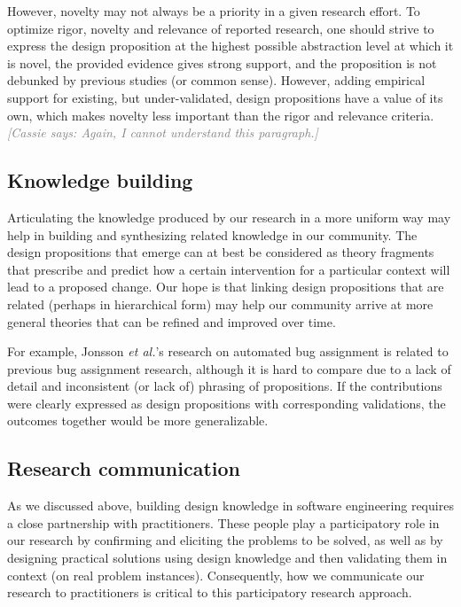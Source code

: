 \documentclass[graybox]{svmult}
\newcommand{\cassie}[1]{\textcolor{gray}{{\it [Cassie says: #1]}}}
\newcommand{\cassie}[1]{}
\begin{document}
However, novelty may not always be a priority in a given research effort.
To optimize rigor, novelty and relevance of reported research, one should strive to express the design proposition at the highest possible abstraction level at which it is novel, the provided evidence gives strong support, and the proposition is not debunked by previous studies (or common sense). However, adding empirical support for existing, but under-validated, design propositions have a value of its own, which makes novelty less important than the rigor and relevance criteria.\cassie{Again, I cannot understand this paragraph.}


\subsection{Knowledge building}
\label{sec:knowledge}

Articulating the knowledge produced by our research in a more uniform way may help in building and synthesizing related knowledge in our community. 
The design propositions that emerge can at best be considered as theory fragments that prescribe and predict how a certain intervention for a particular context will lead to a proposed change. 
Our hope is that linking design propositions that are related (perhaps in hierarchical form) may help our community arrive at more general theories that can be refined and improved over time.

For example, Jonsson \emph{et al.}'s research on automated bug assignment is related to previous bug assignment research, although it is hard to compare due to a lack of detail and inconsistent (or lack of) phrasing of propositions. If the contributions were clearly expressed as design propositions with corresponding validations, the outcomes together would be more generalizable.



\subsection{Research communication}
\label{sec:communication}

As we discussed above, building design knowledge in software engineering requires a close partnership with practitioners. 
These people play a participatory role in our research by confirming and eliciting the problems to be solved, as well as by designing practical solutions using design knowledge and then validating them in context (on real problem instances). 
Consequently, how we communicate our research to practitioners is critical to this participatory research approach.
\end{document}
